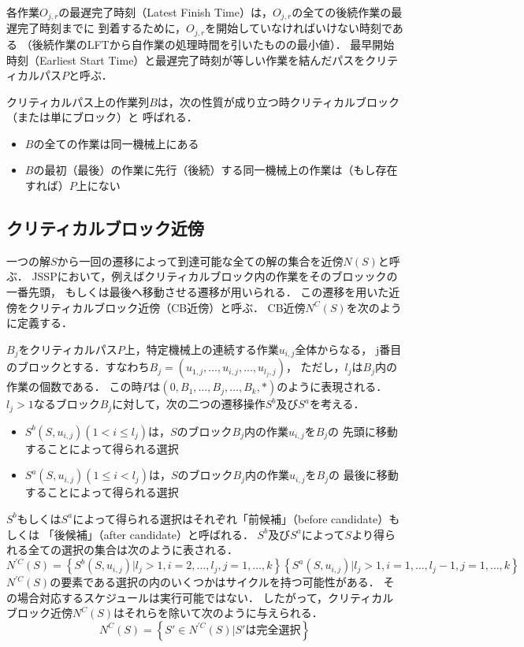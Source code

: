 \documentclass{jsarticle}
\begin{document}
各作業$O_{j,r}$の最遅完了時刻（Latest Finish Time）は，$O_{j,r}$の全ての後続作業の最遅完了時刻までに
到着するために，$O_{j,r}$を開始していなければいけない時刻である
（後続作業のLFTから自作業の処理時間を引いたものの最小値）．
最早開始時刻（Earliest Start Time）と最遅完了時刻が等しい作業を結んだパスをクリティカルパス$P$と呼ぶ．

クリティカルパス上の作業列$B$は，次の性質が成り立つ時クリティカルブロック（または単にブロック）と
呼ばれる．
\begin{itemize}
	\item $B$の全ての作業は同一機械上にある
	\item $B$の最初（最後）の作業に先行（後続）する同一機械上の作業は（もし存在すれば）$P$上にない
\end{itemize}

\subsection{クリティカルブロック近傍}
一つの解$S$から一回の遷移によって到達可能な全ての解の集合を近傍$N(S)$と呼ぶ．
JSSPにおいて，例えばクリティカルブロック内の作業をそのブロッックの一番先頭，
もしくは最後へ移動させる遷移が用いられる．
この遷移を用いた近傍をクリティカルブロック近傍（CB近傍）と呼ぶ．
CB近傍$N^{C}(S)$を次のように定義する．

$B_j$をクリティカルパス$P$上，特定機械上の連続する作業$u_{i,j}$全体からなる，
j番目のブロックとする．すなわち$B_j=(u_{1,j},\dots,u_{i,j},\dots,u_{l_j,j})$，
ただし，$l_j$は$B_j$内の作業の個数である．
この時$P$は$(0,B_1,\dots,B_j,\dots,B_k,*)$のように表現される．
$l_j>1$なるブロック$B_j$に対して，次の二つの遷移操作$S^b$及び$S^a$を考える．
\begin{itemize}
	\item $S^b(S,u_{i,j})(1<i\leq l_j)$は，$S$のブロック$B_j$内の作業$u_{i,j}$を$B_j$の
		先頭に移動することによって得られる選択
	\item $S^a(S,u_{i,j})(1\leq i<l_j)$は，$S$のブロック$B_j$内の作業$u_{i,j}$を$B_j$の
		最後に移動することによって得られる選択
\end{itemize}
$S^b$もしくは$S^a$によって得られる選択はそれぞれ「前候補」（before candidate）もしくは
「後候補」（after candidate）と呼ばれる．
$S^b$及び$S^a$によって$S$より得られる全ての選択の集合は次のように表される．
\begin{equation}
	N^{'C}(S)=\left\{ S^b(S,u_{i,j})|l_j>1,i=2,\dots,l_j,j=1,\dots,k \right\}
	\left\{ S^a(S,u_{i,j})|l_j>1,i=1,\dots,l_j-1,j=1,\dots,k \right\}
\end{equation}
$N^{'C}(S)$の要素である選択の内のいくつかはサイクルを持つ可能性がある．
その場合対応するスケジュールは実行可能ではない．
したがって，クリティカルブロック近傍$N^C(S)$はそれらを除いて次のように与えられる．
\begin{equation}
	N^C(S)=\left\{S'\in N^{'C}(S)|S' は完全選択 \right\}
\end{equation}
\end{document}
